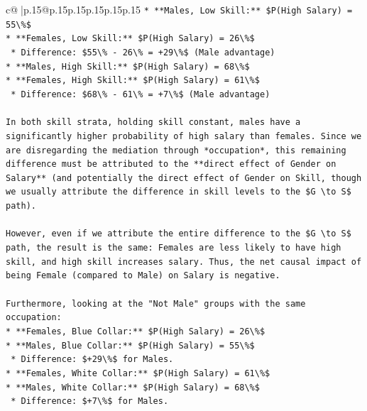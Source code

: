 \documentclass{article}
\begin{document}
{\begin{supertabular}{c@{$\;$}|p{.15\linewidth}@{}p{.15\linewidth}p{.15\linewidth}p{.15\linewidth}p{.15\linewidth}p{.15\linewidth}}
{{{\texttt{*   **Males, Low Skill:** \$P(High Salary) = 55\textbackslash{}\%\$} \\
\texttt{*   **Females, Low Skill:** \$P(High Salary) = 26\textbackslash{}\%\$} \\
\texttt{    *   Difference: \$55\textbackslash{}\% {-} 26\textbackslash{}\% = +29\textbackslash{}\%\$ (Male advantage)} \\
\texttt{*   **Males, High Skill:** \$P(High Salary) = 68\textbackslash{}\%\$} \\
\texttt{*   **Females, High Skill:** \$P(High Salary) = 61\textbackslash{}\%\$} \\
\texttt{    *   Difference: \$68\textbackslash{}\% {-} 61\textbackslash{}\% = +7\textbackslash{}\%\$ (Male advantage)} \\
\\ 
\texttt{In both skill strata, holding skill constant, males have a significantly higher probability of high salary than females. Since we are disregarding the mediation through *occupation*, this remaining difference must be attributed to the **direct effect of Gender on Salary** (and potentially the direct effect of Gender on Skill, though we usually attribute the difference in skill levels to the \$G \textbackslash{}to S\$ path).} \\
\\ 
\texttt{However, even if we attribute the entire difference to the \$G \textbackslash{}to S\$ path, the result is the same: Females are less likely to have high skill, and high skill increases salary. Thus, the net causal impact of being Female (compared to Male) on Salary is negative.} \\
\\ 
\texttt{Furthermore, looking at the "Not Male" groups with the same occupation:} \\
\texttt{*   **Females, Blue Collar:** \$P(High Salary) = 26\textbackslash{}\%\$} \\
\texttt{*   **Males, Blue Collar:** \$P(High Salary) = 55\textbackslash{}\%\$} \\
\texttt{    *   Difference: \$+29\textbackslash{}\%\$ for Males.} \\
\texttt{*   **Females, White Collar:** \$P(High Salary) = 61\textbackslash{}\%\$} \\
\texttt{*   **Males, White Collar:** \$P(High Salary) = 68\textbackslash{}\%\$} \\
\texttt{    *   Difference: \$+7\textbackslash{}\%\$ for Males.} \\
\\ 
}}}
\end{supertabular}}
\end{document}
